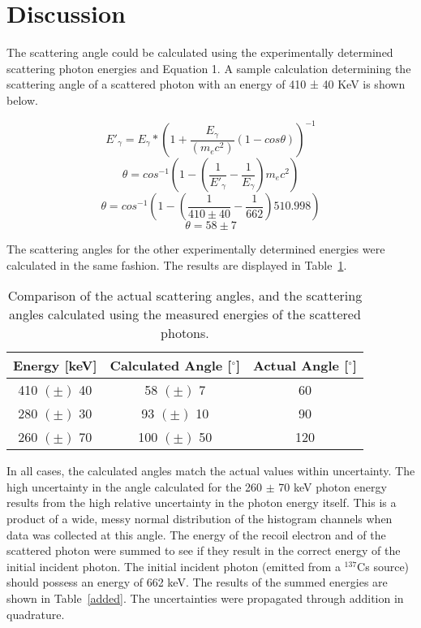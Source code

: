 \documentclass[prb,preprint,groupaddress,showpacs,superbib,floats]{revtex4-1}
\begin{document}

\section{Discussion}
The scattering angle could be calculated using the experimentally determined scattering photon energies and Equation 1. A sample calculation determining the scattering angle of a scattered photon with an energy of 410 ± 40 KeV is shown below. 

\[E'_\gamma= E_\gamma*(1+\frac{E_\gamma}{(m_e c^2 )} (1-cos \theta))^{-1}\]
\[\theta=cos^{-1}⁡(1-(\frac{1}{E'_\gamma} -\frac{1}{E_\gamma} )m_e c^2 )\]
\[\theta=cos^{-1}⁡(1-(\frac{1}{410 \pm40}-\frac{1}{662})510.998)\]
\[\theta=58 \pm7\]


The scattering angles for the other experimentally determined energies were calculated in the same fashion. The results are displayed in Table~\ref{realvexp}. 
%

\begin{table}[h]
	\begin{ruledtabular}
		\begin{tabular}{ccc}
			
			\textbf{Energy [keV]} & \textbf{Calculated Angle [$^{\circ}$]} & \textbf{Actual Angle [$^{\circ}$]} \\ 
			\hline
			410 $(\pm)$ 40 & 58 $(\pm)$ 7  & 60  \\ 
			280 $(\pm)$ 30 & 93 $(\pm)$ 10 & 90  \\ 
			260 $(\pm)$ 70 & 100 $(\pm)$ 50 & 120 \\ 
			
		\end{tabular}
	\end{ruledtabular}
	\caption{Comparison of the actual scattering angles, and the scattering angles calculated using the measured energies of the scattered photons. }
	\label{realvexp}
\end{table}


In all cases, the calculated angles match the actual values within uncertainty. The high uncertainty in the angle calculated for the 260 $\pm$ 70 keV photon energy results from the high relative uncertainty in the photon energy itself. This is a product of a wide, messy normal distribution of the histogram channels when data was collected at this angle. 
The energy of the recoil electron and of the scattered photon were summed to see if they result in the correct energy of the initial incident photon. The initial incident photon (emitted from a $^{137}$Cs source) should possess an energy of 662 keV. The results of the summed energies are shown in Table~\ref{added}. The uncertainties were propagated through addition in quadrature.
%
\end{document}
